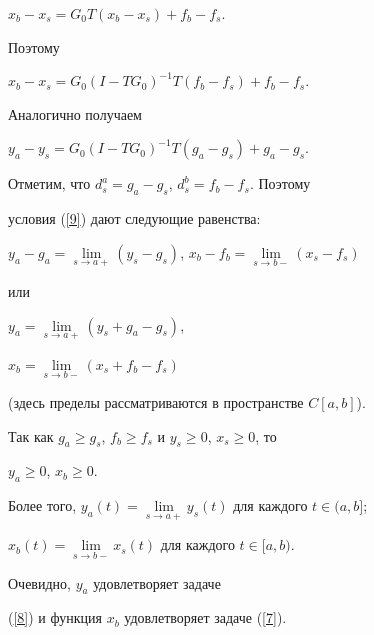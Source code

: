 \begin{pf}
$x_b-x_s=G_0T(x_b-x_s)+f_b-f_s$.


Поэтому


$x_b-x_s=G_0(I-TG_0)^{-1}T(f_b-f_s)+f_b-f_s$.


Аналогично получаем


$y_a-y_s=G_0(I-TG_0)^{-1}T(g_a-g_s)+g_a-g_s$.


Отметим, что $d_s^a=g_a-g_s$, $d_s^b=f_b-f_s$. Поэтому


условия (\ref{9}) дают следующие равенства:


$y_a-g_a=\lim\limits_{s\to a+}(y_s-g_s)$, $x_b-f_b=\lim\limits_{s\to


b-}(x_s-f_s)$


или


$y_a=\lim\limits_{s\to a+}(y_s+g_a-g_s)$,


$x_b=\lim\limits_{s\to b-}(x_s+f_b-f_s)$


(здесь пределы рассматриваются в пространстве $C[a,b]$).





Так как $g_a\ge g_s$, $f_b\ge f_s$ и $y_s\ge0$, $x_s\ge0$, то


$y_a\ge0$, $x_b\ge0$.


Более того, $y_a(t)=\lim\limits_{s\to a+}y_s(t)$ для каждого $t\in(a,b]$;


$x_b(t)=\lim\limits_{s\to b-} x_s(t)$ для каждого $t\in[a,b)$.


Очевидно, $y_a$ удовлетворяет задаче


(\ref{8}) и функция $x_b$ удовлетворяет задаче (\ref{7}).


\end{pf}





